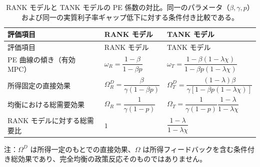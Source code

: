 \documentclass[
  japanese,
  lualatex,
  ja=standard,
  12pt,
  a4paper]{ltjsarticle}
\begin{document}
\begin{longtable}[]{@{}
  >{\raggedright\arraybackslash}p{}
  >{\raggedright\arraybackslash}p{}
  >{\raggedright\arraybackslash}p{}@{}}
\caption{RANK モデルと TANK モデルの PE
係数の対比。同一のパラメータ（\(\beta, \gamma, p\)）および同一の実質利子率ギャップ低下に対する条件付き比較である。}\label{tbl-rank-tank-comparison}\tabularnewline
\toprule\noalign{}
\begin{minipage}[b]{\linewidth}\raggedright
評価項目
\end{minipage} & \begin{minipage}[b]{\linewidth}\raggedright
RANK モデル
\end{minipage} & \begin{minipage}[b]{\linewidth}\raggedright
TANK モデル
\end{minipage} \\
\midrule\noalign{}
\endfirsthead
\toprule\noalign{}
\begin{minipage}[b]{\linewidth}\raggedright
評価項目
\end{minipage} & \begin{minipage}[b]{\linewidth}\raggedright
RANK モデル
\end{minipage} & \begin{minipage}[b]{\linewidth}\raggedright
TANK モデル
\end{minipage} \\
\midrule\noalign{}
\endhead
\bottomrule\noalign{}
\endlastfoot
PE 曲線の傾き（有効 MPC） & \(\omega_R = \dfrac{1-\beta}{1-\beta p}\) &
\(\omega_T = \dfrac{1 - \beta(1-\lambda\chi)}{1 - \beta p(1-\lambda\chi)}\) \\
所得固定の直接効果 & \(\Omega_R^D = \dfrac{\beta}{\gamma(1-\beta p)}\) &
\(\Omega_T^D = \dfrac{(1-\lambda)\beta}{\gamma[1 - \beta p(1-\lambda\chi)]}\) \\
均衡における総需要効果 & \(\Omega_R = \dfrac{1}{\gamma(1-p)}\) &
\(\Omega_T = \dfrac{1}{\gamma(1-p)}\dfrac{1-\lambda}{1-\lambda\chi}\) \\
RANK モデルに対する総需要比 & \(1\) &
\(\dfrac{1-\lambda}{1-\lambda\chi}\) \\
\end{longtable}

注：\(\Omega^D\) は所得一定のもとでの直接効果、\(\Omega\)
は所得フィードバックを含む条件付き総効果であり、完全均衡の政策反応そのものではありません。
\end{document}
